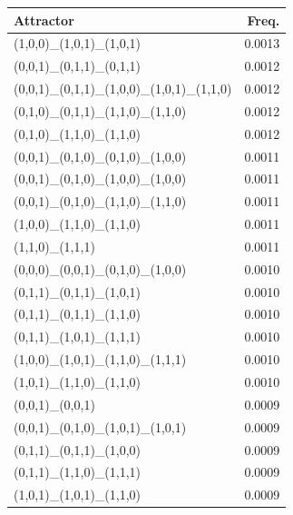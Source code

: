 \begin{minipage}[t]{0.45\linewidth}
\begin{tabular}{@{}lr@{}}
\toprule
Attractor & Freq.\\
\midrule
(1,0,0)\_(1,0,1)\_(1,0,1)                         & 0.0013 \\
(0,0,1)\_(0,1,1)\_(0,1,1)                         & 0.0012 \\
(0,0,1)\_(0,1,1)\_(1,0,0)\_(1,0,1)\_(1,1,0)      & 0.0012 \\
(0,1,0)\_(0,1,1)\_(1,1,0)\_(1,1,0)                & 0.0012 \\
(0,1,0)\_(1,1,0)\_(1,1,0)                         & 0.0012 \\
(0,0,1)\_(0,1,0)\_(0,1,0)\_(1,0,0)                & 0.0011 \\
(0,0,1)\_(0,1,0)\_(1,0,0)\_(1,0,0)                & 0.0011 \\
(0,0,1)\_(0,1,0)\_(1,1,0)\_(1,1,0)                & 0.0011 \\
(1,0,0)\_(1,1,0)\_(1,1,0)                         & 0.0011 \\
(1,1,0)\_(1,1,1)                                   & 0.0011 \\
(0,0,0)\_(0,0,1)\_(0,1,0)\_(1,0,0)                & 0.0010 \\
(0,1,1)\_(0,1,1)\_(1,0,1)                         & 0.0010 \\
(0,1,1)\_(0,1,1)\_(1,1,0)                         & 0.0010 \\
(0,1,1)\_(1,0,1)\_(1,1,1)                         & 0.0010 \\
(1,0,0)\_(1,0,1)\_(1,1,0)\_(1,1,1)                & 0.0010 \\
(1,0,1)\_(1,1,0)\_(1,1,0)                         & 0.0010 \\
(0,0,1)\_(0,0,1)                                   & 0.0009 \\
(0,0,1)\_(0,1,0)\_(1,0,1)\_(1,0,1)                & 0.0009 \\
(0,1,1)\_(0,1,1)\_(1,0,0)                         & 0.0009 \\
(0,1,1)\_(1,1,0)\_(1,1,1)                         & 0.0009 \\
(1,0,1)\_(1,0,1)\_(1,1,0)                         & 0.0009 \\
\bottomrule
\end{tabular}
\end{minipage}